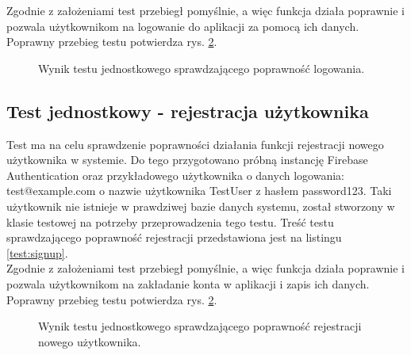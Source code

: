 Zgodnie z założeniami test przebiegł pomyślnie, a więc funkcja działa poprawnie i pozwala użytkownikom na logowanie do aplikacji za pomocą ich danych. Poprawny przebieg testu potwierdza rys. \ref{result:login}. \\
\setlength{\fboxrule}{0.5pt}
\begin{figure}[H]
    \centering
    \caption{Wynik testu jednostkowego sprawdzającego poprawność logowania.}
    \label{result:login}
\end{figure}

\subsection*{Test jednostkowy - rejestracja użytkownika}
Test ma na celu sprawdzenie poprawności działania funkcji rejestracji nowego użytkownika w systemie. Do tego przygotowano próbną instancję Firebase Authentication oraz przykładowego użytkownika o danych logowania: test@example.com o nazwie użytkownika TestUser z hasłem password123. Taki użytkownik nie istnieje w prawdziwej bazie danych systemu, został stworzony w klasie testowej na potrzeby  przeprowadzenia tego testu. Treść testu sprawdzającego poprawność rejestracji przedstawiona jest na listingu \ref{test:signup}. \\
\indent Zgodnie z założeniami test przebiegł pomyślnie, a więc funkcja działa poprawnie i pozwala użytkownikom na zakładanie konta w aplikacji i zapis ich danych. Poprawny przebieg testu potwierdza rys. \ref{result:login}. \\

\setlength{\fboxrule}{0.5pt}
\begin{figure}[H]
    \centering
    \caption{Wynik testu jednostkowego sprawdzającego poprawność rejestracji nowego użytkownika.}
    \label{result:login}
\end{figure}


